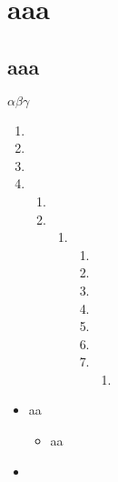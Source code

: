 \documentclass{ctexart}
\begin{document}
\chapter{aaa}
\section{aaa}
\(\alpha \beta \gamma\)
\begin{enumerate}
	\item
	\item
	\item
	\item
	      \begin{enumerate}
		      \item
		      \item
		            \begin{enumerate}
			            \item
			                  \begin{enumerate}
				                  \item
				                  \item
				                  \item
				                  \item
				                  \item
				                  \item
				                  \item
				                        \begin{enumerate}
					                        \item
				                        \end{enumerate}

			                  \end{enumerate}
		            \end{enumerate}
	      \end{enumerate}
\end{enumerate}
\begin{itemize}
	\item aa
	      \begin{itemize}
		      \item aa
		            \begin{itemize}
			            \begin{itemize}

			            \end{itemize}
		            \end{itemize}
	      \end{itemize}
	\item
\end{itemize}
\end{document}
